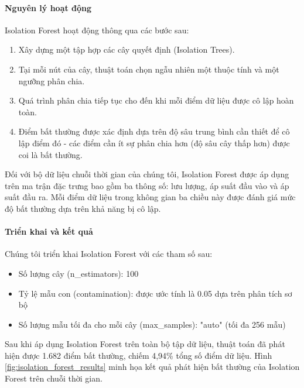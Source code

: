 \paragraph{Nguyên lý hoạt động}
Isolation Forest hoạt động thông qua các bước sau:
\begin{enumerate}
    \item Xây dựng một tập hợp các cây quyết định (Isolation Trees).
    \item Tại mỗi nút của cây, thuật toán chọn ngẫu nhiên một thuộc tính và một ngưỡng phân chia.
    \item Quá trình phân chia tiếp tục cho đến khi mỗi điểm dữ liệu được cô lập hoàn toàn.
    \item Điểm bất thường được xác định dựa trên độ sâu trung bình cần thiết để cô lập điểm đó - các điểm cần ít sự phân chia hơn (độ sâu cây thấp hơn) được coi là bất thường.
\end{enumerate}

Đối với bộ dữ liệu chuỗi thời gian của chúng tôi, Isolation Forest được áp dụng trên ma trận đặc trưng bao gồm ba thông số: lưu lượng, áp suất đầu vào và áp suất đầu ra. Mỗi điểm dữ liệu trong không gian ba chiều này được đánh giá mức độ bất thường dựa trên khả năng bị cô lập.

\paragraph{Triển khai và kết quả}
Chúng tôi triển khai Isolation Forest với các tham số sau:
\begin{itemize}
    \item Số lượng cây (n\_estimators): 100
    \item Tỷ lệ mẫu con (contamination): được ước tính là 0.05 dựa trên phân tích sơ bộ
    \item Số lượng mẫu tối đa cho mỗi cây (max\_samples): "auto" (tối đa 256 mẫu)
\end{itemize}

Sau khi áp dụng Isolation Forest trên toàn bộ tập dữ liệu, thuật toán đã phát hiện được 1.682 điểm bất thường, chiếm 4,94\% tổng số điểm dữ liệu. Hình \ref{fig:isolation_forest_results} minh họa kết quả phát hiện bất thường của Isolation Forest trên chuỗi thời gian.


